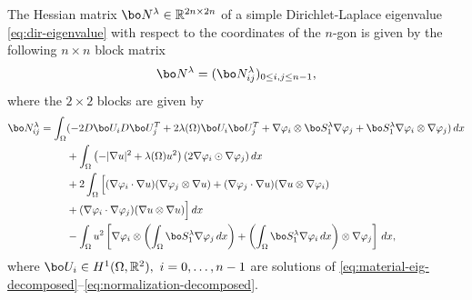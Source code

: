 \begin{thm} The Hessian matrix $\bo N^\lambda \in \Bbb{R}^{2n\times 2n}$ of a simple Dirichlet-Laplace eigenvalue \eqref{eq:dir-eigenvalue} with respect to the coordinates of the $n$-gon is given by the following $n\times n$ block matrix
\[
\bo N^\lambda = (\bo N_{ij}^\lambda)_{0\leq i,j\leq n-1},
\]
where the $2\times 2$ blocks are given by
\begin{align}\label{eq:Hessian-lambda-block}
\bo N_{ij}^\lambda = \int_\Omega& (-2D \bo U_i D \bo U_j^T+ 2\lambda(\Omega) \bo U_i \bo U_j^T + \nabla \varphi_i \otimes \bo S_1^\lambda \nabla \varphi_j + \bo S_1^\lambda \nabla \varphi_i \otimes \nabla \varphi_j)\, dx \notag \\
& +\int_\Omega \left(-|\nabla u|^2+\lambda(\Omega) u^2\right) (2 \nabla \varphi_i \odot \nabla \varphi_j) \, dx \notag \\
& +2\int_\Omega \Big[(\nabla \varphi_i\cdot \nabla u)(\nabla \varphi_j \otimes \nabla u)+(\nabla \varphi_j \cdot \nabla u)(\nabla u \otimes \nabla \varphi_i) \\
&+(\nabla \varphi_i \cdot \nabla \varphi_j)(\nabla u \otimes \nabla u)\Big] \, dx\notag \\
& - \int_\Omega u^2\left[\nabla \varphi_i \otimes \left(\int_\Omega \bo S_1^\lambda \nabla \varphi_j \, dx \right)+
\left(\int_\Omega \bo S_1^\lambda \nabla \varphi_i\, dx\right)\otimes \nabla \varphi_j \right]\, dx, \notag
\end{align}
where $\bo U_i \in H^1(\Omega,\Bbb{R}^2),\ i=0,\dots,n-1$ are solutions of \eqref{eq:material-eig-decomposed}--\eqref{eq:normalization-decomposed}.
\label{thm:hessian-eig}
\end{thm}

